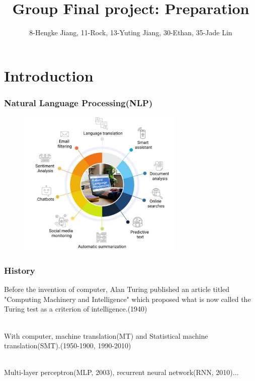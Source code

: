 \documentclass{beamer}
\title[Final project] 
{Group Final project: Preparation}
\author{8-Hengke Jiang, 11-Rock, 13-Yuting Jiang, 30-Ethan, 35-Jade Lin}
\date[6.30.2024] %
\begin{document}
\frame{\titlepage}
\section{Introduction}
\begin{frame}
  \frametitle{Natural Language Processing(NLP)}
  
  \begin{figure}[H]
    \centering
    \includegraphics[width=8cm]{pictures/屏幕截图 2024-06-30 163118.png}
  \end{figure}

\end{frame}
\begin{frame}
  \frametitle{History}
  Before the invention of computer, Alan Turing published an article titled "Computing Machinery and Intelligence" which proposed what is now called the Turing test as a criterion of intelligence.(1940)\\\

  With computer, machine translation(MT) and Statistical machine translation(SMT).(1950-1900, 1990-2010)\\\

  Multi-layer perceptron(MLP, 2003), recurrent neural network(RNN, 2010)...
\end{frame}
\end{document}
